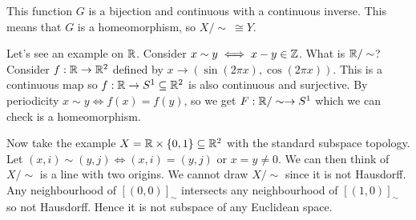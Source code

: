 \documentclass{article}
\begin{document}
\begin{remark}
  This function $ G $ is a bijection and continuous with a continuous inverse. This means that $ G $ is a homeomorphism, so $ X/\sim\ \cong Y $.
\end{remark}
Let's see an example on $ \mathbb{R} $. Consider $ x\sim y\iff x-y\in \mathbb{Z} $. What is $ \mathbb{R}/\sim $? Consider $ f:\mathbb{R}\to \mathbb{R}^2 $ defined by $ x\to(\sin(2\pi x), \cos(2\pi x)) $. This is a continuous map so $ f:\mathbb{R}\to S^1\subseteq \mathbb{R}^2 $ is also continuous and surjective. By periodicity $ x\sim y\iff f(x)=f(y) $, so we get $ F:\mathbb{R}/\sim \to S^1 $ which we can check is a homeomorphism.
\par
Now take the example $ X=\mathbb{R}\times \{0,1\}\subseteq \mathbb{R}^2 $ with the standard subspace topology. Let $ (x,i)\sim (y,j)\iff (x,i)=(y,j) $ or $ x=y\ne 0 $. We can then think of $ X/\sim $ is a line with two origins. We cannot draw $ X/\sim $ since it is not Hausdorff. Any neighbourhood of $ [(0,0)]_\sim $ intersects any neighbourhood of $ [(1,0)]_\sim $ so not Hausdorff. Hence it is not subspace of any Euclidean space.
\end{document}
